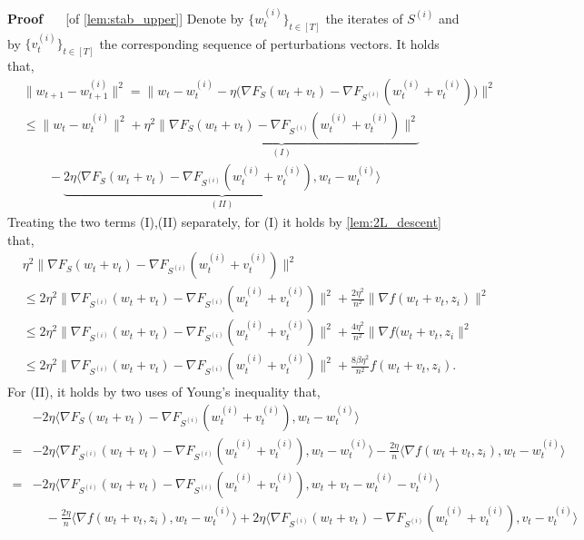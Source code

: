 \documentclass[11pt]{article}
\renewenvironment{proof}[1][]{%
  \par\noindent\textbf{\upshape Proof%
  \if\relax\detokenize{#1}\relax\else\ #1\fi}\ %
}{\jmlrQED}
\begin{document}
\begin{proof} [of \cref{lem:stab_upper}]
Denote by $\{w_t^{(i)}\}_{t\in [T]}$ the iterates of $S^{(i)}$ and by  $\{v_t^{(i)}\}_{t\in [T]}$ the corresponding sequence of perturbations vectors.
It holds that,
\begin{align*}
    &\|w_{t+1} - w_{t+1}^{(i)}\|^2=\| w_t - w_t^{(i)} - \eta \big(\nabla F_{S}(w_t + v_t) - \nabla F_{S^{(i)}}(w_t^{(i)}+ v_t^{(i)})\big)\|^2 \\
    & \leq \|w_t-w_{t}^{(i)}\|^2 + \underbrace{\eta^2 \| \nabla F_{S}(w_t + v_t) - \nabla F_{S^{(i)}}(w_t^{(i)}+ v_t^{(i)}) \|^2}_{(I)}  \\
    & \hspace{2em} - \underbrace{2\eta \langle \nabla F_{S}(w_t + v_t) - \nabla F_{S^{(i)}}(w_t^{(i)}+v_t^{(i)}), w_t - w_t^{(i)} \rangle}_{(II)} 
\end{align*}
Treating the two terms (I),(II) separately, for (I) it holds by \cref{lem:2L_descent} that,
\begin{align*}
    &\eta^2 \| \nabla F_{S}(w_t + v_t) - \nabla F_{S^{(i)}}(w_t^{(i)}+ v_t^{(i)}) \|^2 \\
    & \leq 2 \eta^2 \|\nabla F_{S^{(i)}}(w_t + v_t) - \nabla F_{S^{(i)}}(w_t^{(i)} + v_t^{(i)})\|^2 + \frac{2\eta^2}{n^2}\|\nabla f(w_t + v_t,z_i)\|^2 \\
    & \leq 2\eta^2 \|\nabla F_{S^{(i)}}(w_t + v_t) - \nabla F_{S^{(i)}}(w_t^{(i)} + v_t^{(i)})\|^2 + \frac{4\eta^2}{n^2}\|\nabla f(w_t + v_t,z_i\|^2
    \\ & \leq 2\eta^2 \|\nabla F_{S^{(i)}}(w_t + v_t) - \nabla F_{S^{(i)}}(w_t^{(i)} + v_t^{(i)})\|^2 + \frac{8\beta\eta^2}{n^2}f(w_t + v_t,z_i).
\end{align*}
For (II), it holds by two uses of Young's inequality that,
\begin{align*}
    &-2\eta \langle \nabla F_{S}(w_t + v_t) - \nabla F_{S^{(i)}}(w_t^{(i)}+v_t^{(i)}), w_t - w_t^{(i)} \rangle \\
    =&  -2\eta \langle \nabla F_{S^{(i)}}(w_t + v_t) - \nabla F_{S^{(i)}}(w_t^{(i)}+v_t^{(i)}), w_t - w_t^{(i)} \rangle - \frac{2\eta}{n} \langle \nabla f(w_t + v_t,z_i), w_t -w_t^{(i)} \rangle
    \\
    = & -2\eta \langle \nabla F_{S^{(i)}}(w_t + v_t) - \nabla F_{S^{(i)}}(w_t^{(i)}+v_t^{(i)}), w_t +v_t - w_t^{(i)} - v_t^{(i)} \rangle\\
    &  \quad- \frac{2\eta}{n} \langle \nabla f(w_t + v_t,z_i), w_t -w_t^{(i)} \rangle + 2\eta \langle \nabla F_{S^{(i)}}(w_t + v_t) - \nabla F_{S^{(i)}}(w_t^{(i)}+v_t^{(i)}), v_t - v_t^{(i)} \rangle \\

\end{align*}
\end{proof}
\end{document}
